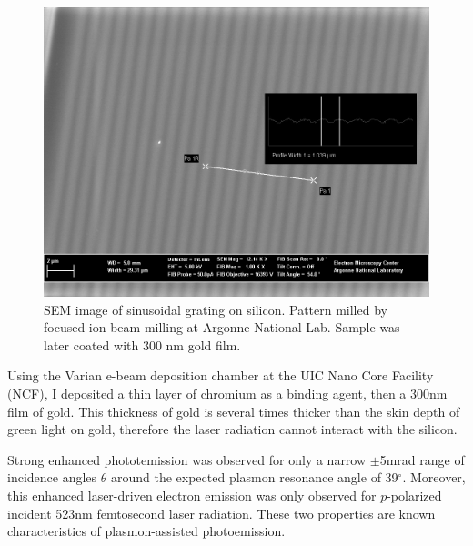 \begin{figure}
  \centering
  \includegraphics{HighMagSEM.jpg}
  \caption{
    SEM image of sinusoidal grating on silicon.
    Pattern milled by focused ion beam milling at Argonne National Lab.
    Sample was later coated with 300 nm gold film.
  }
  \label{fig:fib-si-sem}
\end{figure}

Using the Varian e-beam deposition chamber at the UIC Nano Core Facility (NCF), I deposited a thin layer of chromium as a binding agent, then a 300nm film of gold.
This thickness of gold is several times thicker than the skin depth of green light on gold, therefore the laser radiation cannot interact with the silicon.

\begin{figure}
  \centering
  
  \caption{}
  \label{fig:pape}
\end{figure}

Strong enhanced phototemission was observed for only a narrow $\pm$5mrad range of incidence angles $\theta$ around the expected plasmon resonance angle of 39$^{\circ}$.
Moreover, this enhanced laser-driven electron emission was only observed for $p$-polarized incident 523nm femtosecond laser radiation.
These two properties are known characteristics of plasmon-assisted photoemission.

